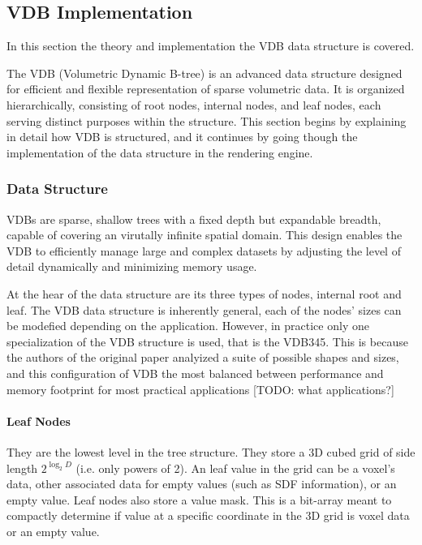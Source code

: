 \subsection{VDB Implementation}

In this section the theory and implementation the VDB data structure is covered.


The VDB (Volumetric Dynamic B-tree) is an advanced data structure designed for efficient and flexible representation of sparse volumetric data. It is organized hierarchically, consisting of root nodes, internal nodes, and leaf nodes, each serving distinct purposes within the structure. This section begins by explaining in detail how VDB is structured, and it continues by going though the implementation of the data structure in the rendering engine.

\subsubsection{Data Structure}
VDBs are sparse, shallow trees with a fixed depth but expandable breadth, capable of covering an virutally infinite spatial domain. This design enables the VDB to efficiently manage large and complex datasets by adjusting the level of detail dynamically and minimizing memory usage.


At the hear of the data structure are its three types of nodes, internal root and leaf. The VDB data structure is inherently general, each of the nodes' sizes can be modefied depending on the application. However, in practice only one specialization of the VDB structure is used, that is the VDB345. This is because the authors of the original paper\supercite{vdb2013} analyized a suite of possible shapes and sizes, and this configuration of VDB the most balanced between performance and memory footprint for most practical applications [TODO: what applications?]

\paragraph{Leaf Nodes} They are the lowest level in the tree structure. They store a 3D cubed grid of side length $2^{\log_{2} D}$ (i.e. only powers of 2). An leaf value in the grid can be a voxel's data, other associated data for empty values (such as SDF information), or an empty value.
Leaf nodes also store a value mask. This is a bit-array meant to compactly determine if value at a specific coordinate in the 3D grid is voxel data or an empty value.

